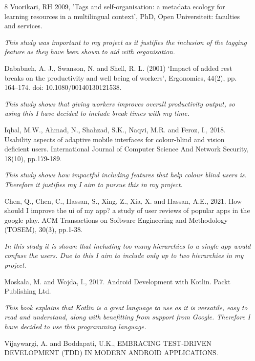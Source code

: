 \documentclass[12pt]{article}
\begin{document}
\begin{thebibliography}{8}
    Vuorikari, RH 2009, 'Tags and self-organisation: a metadata ecology for learning resources in a multilingual context', PhD, Open Universiteit: faculties and services.

   \textit{This study was important to my project as it justifies the inclusion of the tagging feature as they have been shown to aid with organisation.}


    Dababneh, A. J., Swanson, N. and Shell, R. L. (2001) ‘Impact of added rest breaks on the productivity and well being of workers’, Ergonomics, 44(2), pp. 164–174. doi: 10.1080/00140130121538.

    \textit{This study shows that giving workers improves overall productivity output, so using this I have decided to include break times with my time.}

    Iqbal, M.W., Ahmad, N., Shahzad, S.K., Naqvi, M.R. and Feroz, I., 2018. Usability aspects of adaptive mobile interfaces for colour-blind and vision deficient users. International Journal of Computer Science And Network Security, 18(10), pp.179-189.

    \textit{This study shows how impactful including features that help colour blind users is. Therefore it justifies my I aim to pursue this in my project.} 



    Chen, Q., Chen, C., Hassan, S., Xing, Z., Xia, X. and Hassan, A.E., 2021. How should I improve the ui of my app? a study of user reviews of popular apps in the google play. ACM Transactions on Software Engineering and Methodology (TOSEM), 30(3), pp.1-38.

    \textit{In this study it is shown that including too many hierarchies to a single app would confuse the users. Due to this I aim to include only up to two hierarchies in my project.}


    Moskala, M. and Wojda, I., 2017. Android Development with Kotlin. Packt Publishing Ltd.

    \textit{This book explains that Kotlin is a great language to use as it is versatile, easy to read and understand, along with benefitting from support from Google. Therefore I have decided to use this programming language.}

    Vijaywargi, A. and Boddapati, U.K., EMBRACING TEST-DRIVEN DEVELOPMENT (TDD) IN MODERN ANDROID APPLICATIONS.



\end{thebibliography}
\end{document}
